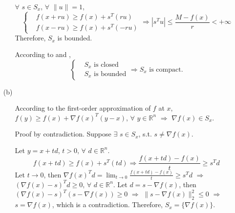 \documentclass[11pt,letter,notitlepage]{article}
\theoremstyle{definition}
\begin{document}
\begin{solution}
\begin{enumerate}
\begin{enumerate}
        $\forall$ $s \in S_x$, $\forall$ $\|u\| = 1$,
        $$
        \left\{
        \begin{aligned}
        &f(x + r u) \ge f(x) + s^T (r u)\\
        &f(x - r u) \ge f(x) + s^T (-r u)
        \end{aligned}
        \right.
        \Longrightarrow
        |s^T u| \le \frac{M - f(x)}{r} < +\infty
        $$
        Therefore, $S_x$ is bounded.
        \item[\ding{176}] According to  and ,
        $$
        \left\{
        \begin{aligned}
        &S_x \text{ is closed}\\
        &S_x \text{ is bounded}
        \end{aligned}
        \right.
        \Longrightarrow
        S_x \text{ is compact.}
        $$
    \end{enumerate}
    \item[(b)]
    \begin{enumerate}
        \item[\ding{172}] According to the first-order approximation of $f$ at $x$, $f(y) \geq f(x) + \nabla f(x)^T (y-x)$, $\forall$ $y \in \mathbb{R}^n$ $\Longrightarrow$ $\nabla f(x) \in S_x$.
        \item[\ding{173}] Proof by contradiction. Suppose $\exists$ $s \in S_x$, s.t. $s \neq \nabla f(x)$.
        
        Let $y = x + td$, $t > 0$, $\forall$ $d \in \mathbb{R}^n$.
        $$
        f(x+td) \geq f(x) + s^T (td) \Longrightarrow \frac{f(x+td) - f(x)}{t} \geq s^T d
        $$
        Let $t \to 0$, then $\nabla f(x)^T d = \lim_{t \to 0} \frac{f(x+td) - f(x)}{t} \geq s^T d$ $\Longrightarrow$ $(\nabla f(x) - s)^T d \geq 0$, $\forall$ $d \in \mathbb{R}^n$. Let $d = s - \nabla f(x)$, then $(\nabla f(x) - s)^T (s - \nabla f(x)) \geq 0$ $\Longrightarrow$ $\|s - \nabla f(x)\|_2^2 \leq 0$ $\Longrightarrow$ $s = \nabla f(x)$, which is a contradiction. Therefore, $S_x = \{\nabla f(x)\}$.
    \end{enumerate}
\end{enumerate}
\end{solution}

	
	\newpage
	\newpage
    
    
	
\end{document}
